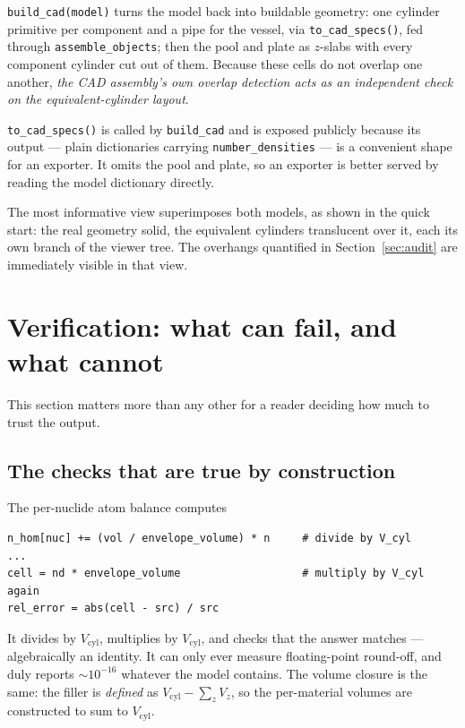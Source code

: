 \documentclass[9pt,a4paper]{extarticle}
\newcommand{\code}[1]{\texttt{\small #1}}
\begin{document}
\code{build\_cad(model)} turns the model back into buildable geometry: one
cylinder primitive per component and a pipe for the vessel, via
\code{to\_cad\_specs()}, fed through \code{assemble\_objects}; then the pool and
plate as $z$-slabs with every component cylinder cut out of them. Because these
cells do not overlap one another, \emph{the CAD assembly's own overlap detection
acts as an independent check on the equivalent-cylinder layout}.

\code{to\_cad\_specs()} is called by \code{build\_cad} and is exposed publicly
because its output --- plain dictionaries carrying \code{number\_densities} ---
is a convenient shape for an exporter. It omits the pool and plate, so an
exporter is better served by reading the model dictionary directly.

The most informative view superimposes both models, as shown in the quick start:
the real geometry solid, the equivalent cylinders translucent over it, each its
own branch of the viewer tree. The overhangs quantified in
Section~\ref{sec:audit} are immediately visible in that view.

\section{Verification: what can fail, and what cannot}
\label{sec:verify}

This section matters more than any other for a reader deciding how much to trust
the output.

\subsection{The checks that are true by construction}

The per-nuclide atom balance computes

\begin{lstlisting}[style=py]
n_hom[nuc] += (vol / envelope_volume) * n     # divide by V_cyl
...
cell = nd * envelope_volume                   # multiply by V_cyl again
rel_error = abs(cell - src) / src
\end{lstlisting}

\noindent
It divides by $V_{\mathrm{cyl}}$, multiplies by $V_{\mathrm{cyl}}$, and checks
that the answer matches --- algebraically an identity. It can only ever measure
floating-point round-off, and duly reports $\sim\!10^{-16}$ whatever the model
contains. The volume closure is the same: the filler is \emph{defined} as
$V_{\mathrm{cyl}}-\sum_z V_z$, so the per-material volumes are constructed to
sum to $V_{\mathrm{cyl}}$.
\end{document}
